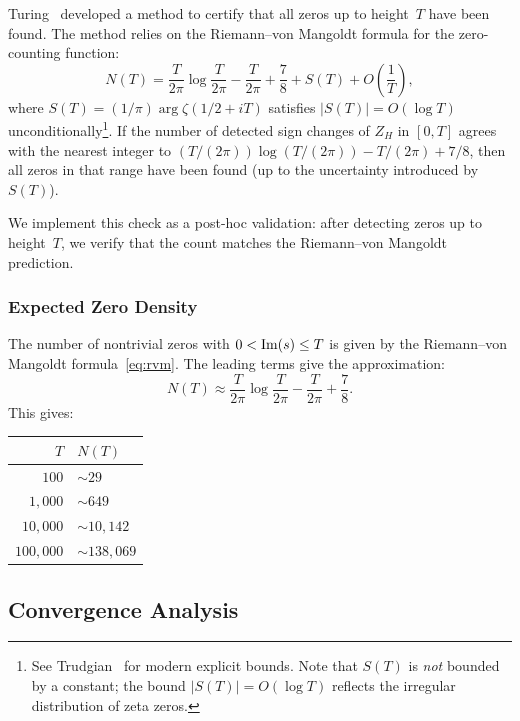 Turing~\cite{turing1953} developed a method to certify that all zeros up to height~$T$
have been found. The method relies on the Riemann--von Mangoldt formula for the
zero-counting function:
\begin{equation}\label{eq:rvm}
  N(T) = \frac{T}{2\pi}\log\frac{T}{2\pi} - \frac{T}{2\pi} + \frac{7}{8}
  + S(T) + O\!\left(\frac{1}{T}\right),
\end{equation}
where $S(T) = (1/\pi)\arg\zeta(1/2 + iT)$ satisfies $|S(T)| = O(\log T)$
unconditionally\footnote{See Trudgian~\cite{trudgian2011} for modern explicit bounds.
Note that $S(T)$ is \emph{not} bounded by a constant; the bound $|S(T)| = O(\log T)$
reflects the irregular distribution of zeta zeros.}. If the number of detected sign
changes of $Z_H$ in $[0, T]$ agrees with the nearest integer to
$(T/(2\pi))\log(T/(2\pi)) - T/(2\pi) + 7/8$, then all zeros in that range have been
found (up to the uncertainty introduced by $S(T)$).

We implement this check as a post-hoc validation: after detecting zeros up to
height~$T$, we verify that the count matches the Riemann--von Mangoldt prediction.

\subsubsection{Expected Zero Density}
\label{sec:zero-density}

The number of nontrivial zeros with $0 < \operatorname{Im}(s) \le T$ is given by the Riemann--von
Mangoldt formula~\eqref{eq:rvm}. The leading terms give the approximation:
\begin{equation}\label{eq:rvm-approx}
  N(T) \approx \frac{T}{2\pi}\log\frac{T}{2\pi} - \frac{T}{2\pi} + \frac{7}{8}.
\end{equation}
This gives:
\begin{center}
\begin{tabular}{@{}rl@{}}
\toprule
$T$ & $N(T)$ \\
\midrule
$100$ & $\sim 29$ \\
$1{,}000$ & $\sim 649$ \\
$10{,}000$ & $\sim 10{,}142$ \\
$100{,}000$ & $\sim 138{,}069$ \\
\bottomrule
\end{tabular}
\end{center}


\subsection{Convergence Analysis}
\label{sec:convergence}

